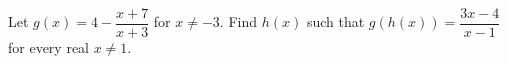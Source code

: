 Let $g(x)=4-\dfrac{x+7}{x+3}$ for $x\ne-3$. Find $h(x)$ such that $g(h(x))=\dfrac{3x-4}{x-1}$ for every real $x\ne1$.
